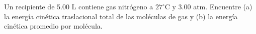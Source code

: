 \item Un recipiente de 5.00 L contiene gas nitrógeno a $27^\circ\text{C}$ y 3.00 atm. Encuentre (a) la energía cinética traslacional total de las moléculas de gas y (b) la energía cinética promedio por molécula.
